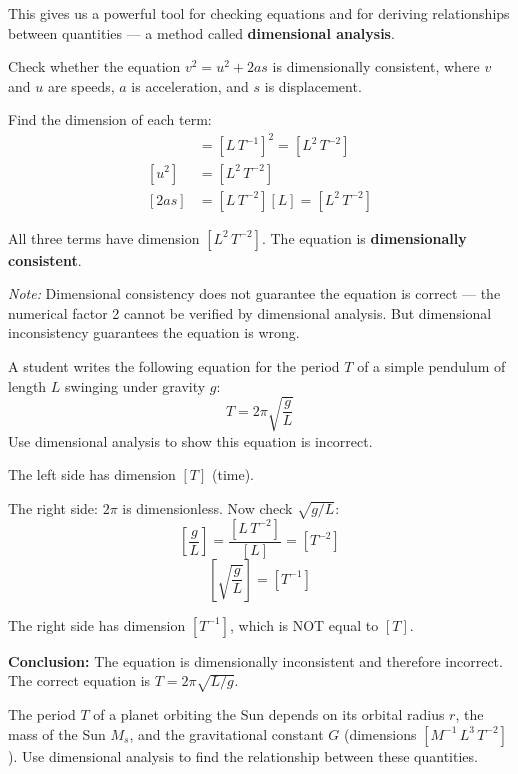 This gives us a powerful tool for checking equations and
for deriving relationships between quantities --- a method
called \textbf{dimensional analysis}.

\begin{examplebox}[1.5]
Check whether the equation $v^2 = u^2 + 2as$ is
dimensionally consistent, where $v$ and $u$ are speeds,
$a$ is acceleration, and $s$ is displacement.
\end{examplebox}

\begin{solutionbox}
Find the dimension of each term:
\begin{align*}
  [v^2] &= [L\,T^{-1}]^2 = [L^2\,T^{-2}]\\[4pt]
  [u^2] &= [L^2\,T^{-2}]\\[4pt]
  [2as] &= [L\,T^{-2}][L] = [L^2\,T^{-2}]
\end{align*}

All three terms have dimension $[L^2\,T^{-2}]$.
The equation is \textbf{dimensionally consistent}.

\textit{Note:} Dimensional consistency does not guarantee
the equation is correct --- the numerical factor 2 cannot
be verified by dimensional analysis. But dimensional
inconsistency guarantees the equation is wrong.
\end{solutionbox}

\begin{examplebox}[1.6]
A student writes the following equation for the period $T$
of a simple pendulum of length $L$ swinging under gravity $g$:
\[
  T = 2\pi\sqrt{\frac{g}{L}}
\]
Use dimensional analysis to show this equation is incorrect.
\end{examplebox}

\begin{solutionbox}
The left side has dimension $[T]$ (time).

The right side: $2\pi$ is dimensionless. Now check
$\sqrt{g/L}$:
\[
  \left[\frac{g}{L}\right]
  = \frac{[L\,T^{-2}]}{[L]}
  = [T^{-2}]
\]
\[
  \left[\sqrt{\frac{g}{L}}\right] = [T^{-1}]
\]

The right side has dimension $[T^{-1}]$, which is NOT equal
to $[T]$.

\textbf{Conclusion:} The equation is dimensionally
inconsistent and therefore incorrect. The correct equation
is $T = 2\pi\sqrt{L/g}$.
\end{solutionbox}

\begin{examplebox}[1.7]
The period $T$ of a planet orbiting the Sun depends on its
orbital radius $r$, the mass of the Sun $M_s$, and the
gravitational constant $G$ (dimensions
$[M^{-1}\,L^3\,T^{-2}]$). Use dimensional analysis to find
the relationship between these quantities.
\end{examplebox}

